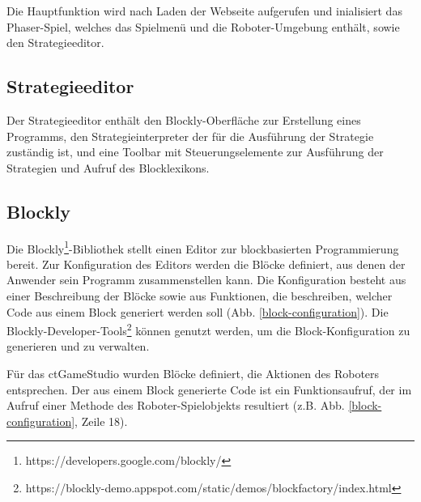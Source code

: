 Die Hauptfunktion wird nach Laden der Webseite aufgerufen und inialisiert das Phaser-Spiel, welches
das Spielmenü und die Roboter-Umgebung enthält, sowie den Strategieeditor.

\subsection{Strategieeditor}

Der Strategieeditor enthält den Blockly-Oberfläche zur Erstellung eines Programms, den
Strategieinterpreter der für die Ausführung der Strategie zuständig ist, und eine Toolbar mit
Steuerungselemente zur Ausführung der Strategien und Aufruf des Blocklexikons.

\subsection{Blockly}

Die Blockly\footnote{https://developers.google.com/blockly/}-Bibliothek stellt einen Editor zur
blockbasierten Programmierung bereit. Zur Konfiguration des Editors werden die Blöcke definiert, aus
denen der Anwender sein Programm zusammenstellen kann. Die Konfiguration besteht aus einer
Beschreibung der Blöcke sowie aus Funktionen, die beschreiben, welcher Code aus einem Block
generiert werden soll (Abb. \ref{block-configuration}). Die
Blockly-Developer-Tools\footnote{https://blockly-demo.appspot.com/static/demos/blockfactory/index.html}
können genutzt werden, um die Block-Konfiguration zu generieren und zu verwalten.

Für das ctGameStudio wurden Blöcke definiert, die Aktionen des Roboters entsprechen. Der aus einem
Block generierte Code ist ein Funktionsaufruf, der im Aufruf einer Methode des Roboter-Spielobjekts
resultiert (z.B. Abb. \ref{block-configuration}, Zeile 18).

